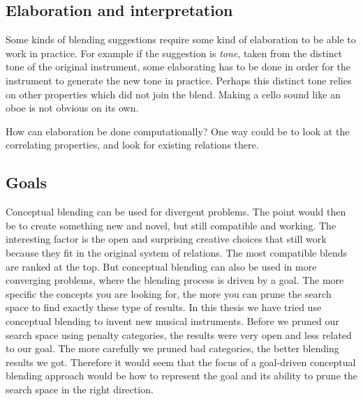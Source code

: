 \subsection{Elaboration and interpretation}
Some kinds of blending suggestions require some kind of elaboration to be able to work in practice. For example if the suggestion is \emph{tone}, taken from the distinct tone of the original instrument, some elaborating has to be done in order for the instrument to generate the new tone in practice. Perhaps this distinct tone relies on other properties which did not join the blend. Making a cello sound like an oboe is not obvious on its own.

How can elaboration be done computationally? One way could be to look at the correlating properties, and look for existing relations there. %


\subsection{Goals}
Conceptual blending can be used for divergent problems. The point would then be to create something new and novel, but still compatible and working. The interesting factor is the open and surprising creative choices that still work because they fit in the original system of relations. The most compatible blends are ranked at the top. But conceptual blending can also be used in more converging problems, where the blending process is driven by a goal. The more specific the concepts you are looking for, the more you can prune the search space to find exactly these type of results. In this thesis we have tried use conceptual blending to invent new musical instruments. Before we pruned our search space using penalty categories, the results were very open and less related to our goal. The more carefully we pruned bad categories, the better blending results we got. Therefore it would seem that the focus of a goal-driven conceptual blending approach would be how to represent the goal and its ability to prune the search space in the right direction.


